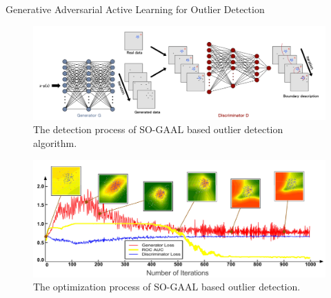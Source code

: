 \documentclass[final]{beamer}
\newlength{\colwidth}
\begin{document}
\begin{frame}[t]
\begin{columns}[t]
\begin{column}{\colwidth}
\begin{exampleblock}{Generative Adversarial Active Learning for Outlier Detection}
  	\begin{figure}
  		\centering
  		\includegraphics{figures/SO-GAAL.png}
  		\caption{The detection process of SO-GAAL based outlier detection algorithm.}
  	\end{figure}
  
    \begin{figure}
  	   \centering
  	   \includegraphics[scale=0.9]{figures/process of SO-GAAL.png}
  	   \caption{The optimization process of SO-GAAL based outlier detection.}
    \end{figure}
  	
  	

\end{exampleblock}
\end{column}
\end{columns}
\end{frame}
\end{document}
